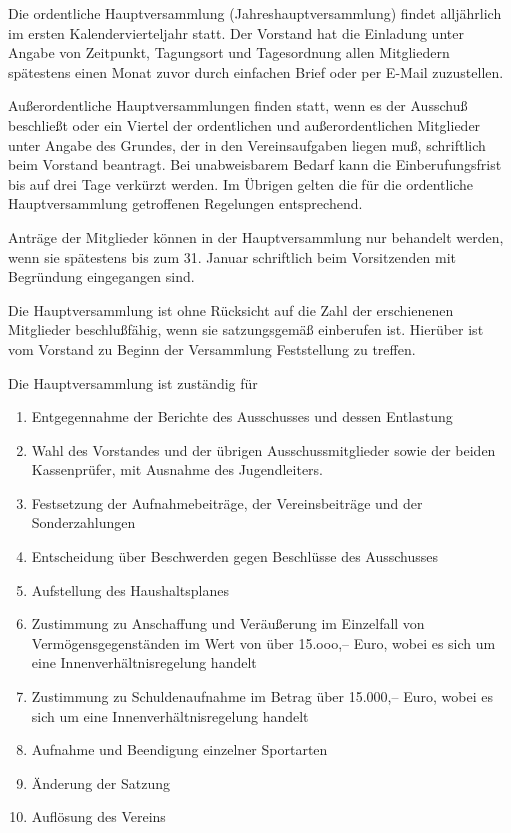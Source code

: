 \documentclass[10pt,a4paper,parskip=half]{scrartcl}
\begin{document}
\begin{contract}
\begin{multicols}{2}
    Die ordentliche Hauptversammlung (Jahreshauptversammlung) findet alljährlich im ersten Kalendervierteljahr statt.
    Der Vorstand hat die Einladung unter Angabe von Zeitpunkt,
    Tagungsort und Tagesordnung allen Mitgliedern spätestens einen Monat zuvor durch einfachen Brief oder per E-Mail zuzustellen.
    
    Außerordentliche Hauptversammlungen finden statt,
    wenn es der Ausschuß beschließt oder ein Viertel der ordentlichen und außerordentlichen Mitglieder unter Angabe des Grundes,
    der in den Vereinsaufgaben liegen muß,
    schriftlich beim Vorstand beantragt.
    Bei unabweisbarem Bedarf kann die Einberufungsfrist bis auf drei Tage verkürzt werden.
    Im Übrigen gelten die für die ordentliche Hauptversammlung getroffenen Regelungen entsprechend.
    
    Anträge der Mitglieder können in der Haupt\-ver\-samm\-lung nur behandelt werden,
    wenn sie spätestens bis zum 31. Januar schriftlich beim Vorsitzenden mit Begründung eingegangen sind.
    
    Die Hauptversammlung ist ohne Rücksicht auf die Zahl der erschienenen Mitglieder beschlußfähig,
    wenn sie satzungsgemäß einberufen ist.
    Hierüber ist vom Vorstand zu Beginn der Versammlung Feststellung zu treffen.
    
    Die Hauptversammlung ist zuständig für
    \begin{enumerate}[label=\alph*),noitemsep]
      \item Entgegennahme der Berichte des Ausschusses und dessen Entlastung
      \item Wahl des Vorstandes und der übrigen Ausschussmitglieder sowie der beiden Kassenprüfer,
            mit Ausnahme des Jugendleiters.
      \item Festsetzung der Aufnahmebeiträge,
            der Vereinsbeiträge und der Sonderzahlungen
      \item Entscheidung über Beschwerden gegen Beschlüsse des Ausschusses
      \item Aufstellung des Haushaltsplanes
      \item Zustimmung zu Anschaffung und Veräußerung im Einzelfall von Vermögensgegenständen im Wert von über 15.ooo,-- Euro,
            wobei es sich um eine Innenverhältnisregelung handelt
      \item Zustimmung zu Schuldenaufnahme im Betrag über 15.000,-- Euro,
            wobei es sich um eine Innenverhältnisregelung handelt
      \item Aufnahme und Beendigung einzelner Sportarten
      \item Änderung der Satzung
      \item Auflösung des Vereins
    \end{enumerate}
    

\end{multicols}
\end{contract}
\end{document}
